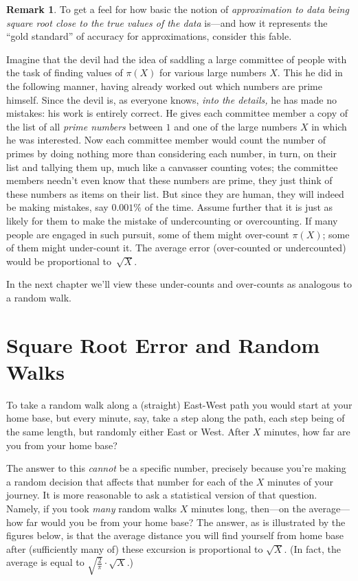\documentclass[openany]{book}
\theoremstyle{plain}
\theoremstyle{definition}
\newtheorem{remark}[theorem]{Remark}
\begin{document}
\begin{remark}
  To get a feel for how basic the notion of {\em approximation to data
    being square root close to the true values of the data} is---and
  how it represents the ``gold standard'' of accuracy for
  approximations, consider this fable.

  Imagine that the devil had the idea of saddling a large committee of
  people with the task of finding values of $\pi(X)$ for various large
  numbers $X$.  This he did in the following manner, having already
  worked out which numbers are prime himself. Since the devil is, as
  everyone knows, {\em into the details,} he has made no mistakes: his
  work is entirely correct.  He gives each committee member a copy of
  the list of all {\em prime numbers} between $1$ and one of the large
  numbers $X$ in which he was interested.  Now each committee member
  would count the number of primes by doing nothing more than
  considering each number, in turn, on their list and tallying them
  up, much like a canvasser counting votes; the committee members  needn't even know that these numbers are prime, they just think of these numbers as items on their list. But since they are human,
  they will indeed be making mistakes, say $0.001\%$ of the time.
  Assume further that it is just as likely for them to make the
  mistake of undercounting or overcounting.  If many people are
  engaged in such pursuit, some of them might over-count $\pi(X)$;
  some of them might under-count it. The average error (over-counted
  or undercounted) would be proportional to~${\sqrt X}$.

  In the next chapter we'll view these under-counts and over-counts as analogous to a random walk.


\end{remark}


\chapter{Square Root Error and Random Walks}

 To take a random walk along a (straight) East-West path  you would start at your home base, but every minute, say, take a step along the path, each step being of the same length, but randomly either East or West. After $X$ minutes, how far are you from your home base?

  The answer to this {\it cannot} be a specific number, precisely because you're making a random decision that affects that number for each of the $X$ minutes of your journey. It is more reasonable to ask a statistical version of that question. Namely, if you took {\it many} random walks $X$ minutes long, then---on the average---how far would you be from your home base?  The answer, as is illustrated by the figures below, is that the average distance you will find yourself from home base after (sufficiently many of) these excursion is proportional to ${\sqrt X}$. (In fact, the average is equal to $\sqrt{\frac{2}{\pi}}\cdot {\sqrt X}$.)
\end{document}
